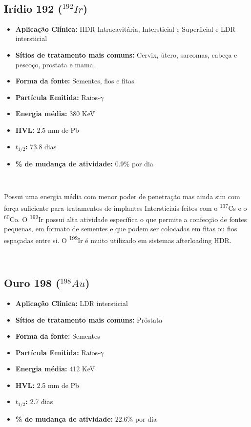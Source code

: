 \documentclass[11pt,a4paper]{article}
\begin{document}
			\

		\subsection{Irídio 192 \textbf{\textcolor{CarnationPink}{(${}^{192}Ir$)}}}

			\begin{itemize}
				\item \textbf{Aplicação Clínica:} HDR Intracavitária, Intersticial e Superficial e LDR intersticial
				\item \textbf{Sítios de tratamento mais comuns:} Cervix, útero, sarcomas, cabeça e pescoço, prostata e mama.
				\item \textbf{Forma da fonte:} Sementes, fios e fitas
				\item \textbf{Partícula Emitida:} Raios-$\gamma$
				\item \textbf{Energia média: } 380 KeV
				\item \textbf{HVL:} 2.5 mm de Pb
				\item \textbf{$t_{1/2}$:} 73.8 dias
				\item \textbf{\% de mudança de atividade: } 0.9\% por dia
			\end{itemize}

			\

			Possui uma energia média com menor poder de penetração mas ainda sim com força suficiente para tratamentos de implantes Intersticiais feitos com o \textsuperscript{137}Cs e o \textsuperscript{60}Co. O \textsuperscript{192}Ir possui alta atividade específica o que permite a confecção de fontes pequenas, em formato de sementes e que podem ser colocadas em fitas ou fios espaçadas entre si. O \textsuperscript{192}Ir é muito utilizado em sistemas afterloading HDR.

			\

			\subsection{Ouro 198 \textbf{\textcolor{CarnationPink}{(${}^{198}Au$)}}}


			\begin{itemize}
				\item \textbf{Aplicação Clínica:} LDR intersticial
				\item \textbf{Sítios de tratamento mais comuns:} Próstata
				\item \textbf{Forma da fonte:} Sementes
				\item \textbf{Partícula Emitida:} Raios-$\gamma$
				\item \textbf{Energia média: } 412 KeV
				\item \textbf{HVL:} 2.5 mm de Pb
				\item \textbf{$t_{1/2}$:} 2.7 dias
				\item \textbf{\% de mudança de atividade: } 22.6\% por dia
			\end{itemize}
\end{document}

